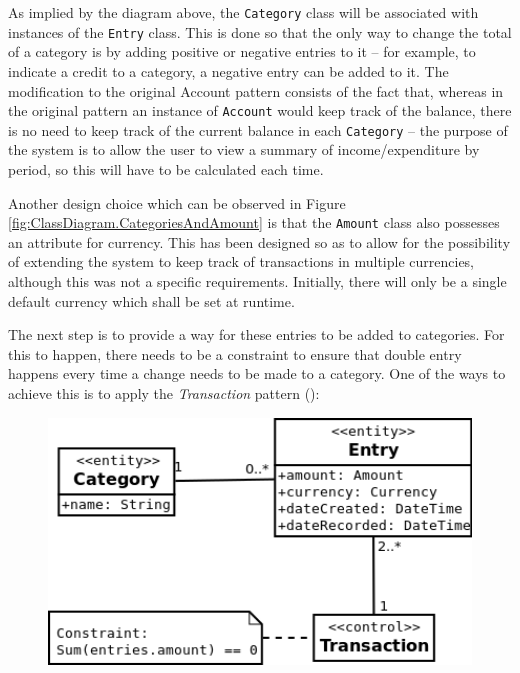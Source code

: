 As implied by the diagram above, the \texttt{Category} class will be associated
with instances of the \texttt{Entry} class. This is done so that the only way to
change the total of a category is by adding positive or negative entries to it
-- for example, to indicate a credit to a category, a negative entry can be
added to it. The modification to the original Account pattern consists of the
fact that, whereas in the original pattern an instance of \texttt{Account}
would keep track of the balance, there is no need to keep track of the current
balance in each \texttt{Category} -- the purpose of the system is to allow the
user to view a summary of income/expenditure by period, so this will have to be
calculated each time.

Another design choice which can be observed in Figure
\ref{fig:ClassDiagram.CategoriesAndAmount} is that the \texttt{Amount} class
also possesses an attribute for currency. This has been designed so as to allow
for the possibility of extending the system to keep track of transactions in
multiple currencies, although this was not a specific requirements. Initially,
there will only be a single default currency which shall be set at runtime.

The next step is to provide a way for these entries to be added to categories.
For this to happen, there needs to be a constraint to ensure that double entry
happens every time a change needs to be made to a category. One of the ways to
achieve this is to apply the \emph{Transaction} pattern
(\cite[][Section~6.2]{fowler1997analysis}):
\begin{figure}[ht!]
  \begin{center}
    \includegraphics[width=14cm]{./contents/img/Class_Diagram_-_Transaction.png}
  \end{center}
\end{figure}
\FloatBarrier

